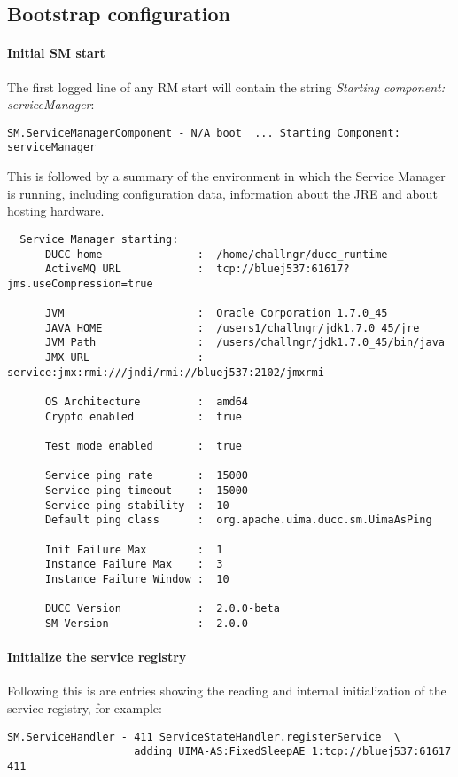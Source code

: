 \subsection{Bootstrap configuration}

    \paragraph{Initial SM start}
    The first logged line of any RM start will contain the string {\em Starting component:  serviceManager}:
\begin{verbatim}
SM.ServiceManagerComponent - N/A boot  ... Starting Component:  serviceManager
\end{verbatim}

    This is followed by a summary of the environment in which the Service Manager is running, including
    configuration data, information about the JRE and about hosting hardware.

\begin{verbatim}
  Service Manager starting:
      DUCC home               :  /home/challngr/ducc_runtime
      ActiveMQ URL            :  tcp://bluej537:61617?jms.useCompression=true
  
      JVM                     :  Oracle Corporation 1.7.0_45
      JAVA_HOME               :  /users1/challngr/jdk1.7.0_45/jre
      JVM Path                :  /users/challngr/jdk1.7.0_45/bin/java
      JMX URL                 :  service:jmx:rmi:///jndi/rmi://bluej537:2102/jmxrmi
  
      OS Architecture         :  amd64
      Crypto enabled          :  true
  
      Test mode enabled       :  true
  
      Service ping rate       :  15000
      Service ping timeout    :  15000
      Service ping stability  :  10
      Default ping class      :  org.apache.uima.ducc.sm.UimaAsPing
  
      Init Failure Max        :  1
      Instance Failure Max    :  3
      Instance Failure Window :  10
  
      DUCC Version            :  2.0.0-beta
      SM Version              :  2.0.0
\end{verbatim}

    \paragraph{Initialize the service registry}
    Following this is are entries showing the reading and internal initialization of the
    service registry, for example:
\begin{verbatim}
SM.ServiceHandler - 411 ServiceStateHandler.registerService  \
                    adding UIMA-AS:FixedSleepAE_1:tcp://bluej537:61617 411
\end{verbatim}

